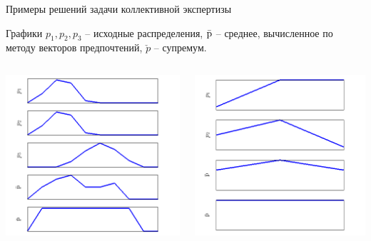 \begin{frame}{Примеры решений задачи  коллективной экспертизы}
  \vspace{-2ex}
  \begin{center}
    Графики $p_1, p_2, p_3$ -- исходные распределения, $\bar{{\mathrm{p}}}$ -- среднее, вычисленное по методу векторов предпочтений, $\check{p}$ -- супремум. 
  \end{center} 
  \vspace{-3ex}
  \begin{columns}
	  \begin{center}
	      \includegraphics[width=0.9\linewidth]{./pic/prefsup102}
	  \end{center}
          \begin{center}
	      \includegraphics[width=1\linewidth]{./pic/prefsup6}
	  \end{center}
  \end{columns}
\end{frame} %

